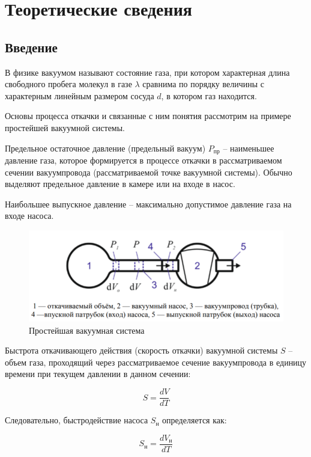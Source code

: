 \documentclass[a4paper, 12pt]{article} %
\begin{document}
\section{Теоретические сведения}
\subsection{Введение}

В физике вакуумом называют состояние газа, при котором характерная длина свободного пробега молекул в газе $\lambda$ сравнима по порядку
величины с характерным линейным размером сосуда $d$, в котором газ
находится.

Основы процесса откачки и связанные с ним понятия рассмотрим
на примере простейшей вакуумной системы.

Предельное остаточное давление (предельный вакуум) $P_{\text{пр}}$ -- наименьшее давление газа, которое формируется в процессе откачки в рассматриваемом сечении вакуумпровода (рассматриваемой точке вакуумной системы). Обычно выделяют предельное давление в
камере или на входе в насос.

Наибольшее выпускное давление -- максимально допустимое давление газа на входе насоса.

\begin{figure}[h]
    \centering
    \includegraphics[width = 11 cm]{1png.png}
    \caption{Простейшая вакуумная система}
    \label{fig:vac}
\end{figure}

Быстрота откачивающего действия (скорость откачки) вакуумной системы $S$ -- объем газа, проходящий через рассматриваемое сечение вакуумпровода в единицу времени при текущем давлении
в данном сечении:
 
\begin{equation}
	S = \frac{dV}{dT}
\end{equation}

Следовательно, быстродействие насоса $S_{\text{н}}$ определяется как:

\begin{equation}
	S_{\text{н}} = \frac{dV_{\text{н}}}{dT}
\end{equation}
\end{document}
